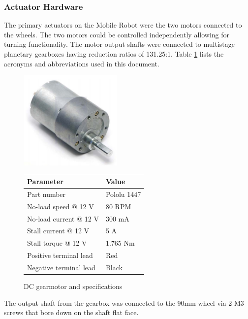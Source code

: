 \documentclass[11pt,a4paper]{article}
\begin{document}
    \subsubsection{Actuator Hardware}
      The primary actuators on the Mobile Robot were the two motors connected to the wheels. The two motors could be controlled independently allowing for turning functionality. The motor output shafts were connected to multistage planetary gearboxes having reduction ratios of 131.25:1.
      Table \ref{gearmotor} lists the acronyms and abbreviations used in this document.
      \begin{figure}[h]
        \begin{minipage}[b]{0.45\linewidth}
          \centering
          \includegraphics[width=5cm]{gearmotor.png}
        \end{minipage}\hfill
        \begin{minipage}[b]{0.45\linewidth}
          \begin{tabular}[b]{|l|l|}
            \hline \textbf{Parameter} & \textbf{Value} \\
            \hline Part number & Pololu 1447\\
            \hline No-load speed @ 12 V & 80 RPM\\
            \hline No-load current @ 12 V & 300 mA\\
            \hline Stall current @ 12 V & 5 A\\
            \hline Stall torque @ 12 V & 1.765 Nm\\
            \hline Positive terminal lead & Red\\
            \hline Negative terminal lead & Black\\
            \hline
          \end{tabular}
        \end{minipage}
        \caption{DC gearmotor and specifications}
        \label{gearmotor}
      \end{figure}
      The output shaft from the gearbox was connected to the 90mm wheel via 2 M3 screws that bore down on the shaft flat face.
\end{document}
